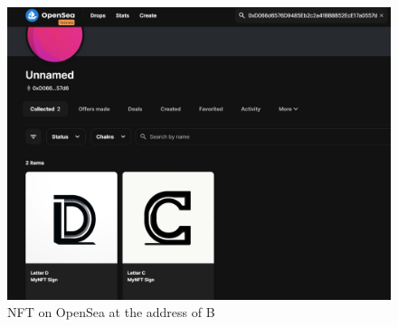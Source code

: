 \begin{itemize}
    \begin{figure} [H] \centering
    \includegraphics[scale=0.15]{gambar/nft_pada_opensea_2.jpeg}
    \caption{NFT on OpenSea at the address of B}
    \label{fig:opensea2}
    \end{figure}
    
\end{itemize}
